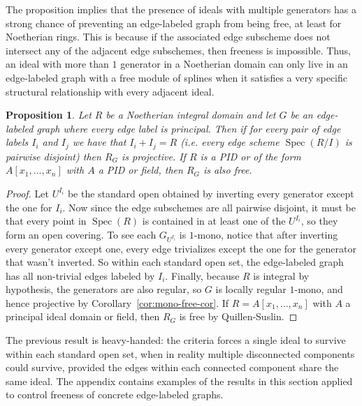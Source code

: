 \documentclass{article}
\DeclareMathOperator{\Spec}{Spec}
\newtheorem{proposition}{Proposition}
\begin{document}
The proposition implies that the presence of ideals with multiple generators has a strong chance of preventing an edge-labeled graph from being free, at least for Noetherian rings. This is because if the associated edge subscheme does not intersect any of the adjacent edge subschemes, then freeness is impossible. Thus, an ideal with more than $1$ generator in a Noetherian domain can only live in an edge-labeled graph with a free module of splines when it satisfies a very specific structural relationship with every adjacent ideal.



\begin{proposition}
\label{prop:noetherian-free}
Let $R$ be a Noetherian integral domain and let $G$ be an edge-labeled graph where every edge label is principal. Then if for every pair of edge labels $I_i$ and $I_j$ we have that $I_i + I_j = R$ (i.e. every edge scheme $\Spec(R/I)$ is pairwise disjoint) then $R_G$ is projective. If $R$ is a PID or of the form $A[x_1,\dots,x_n]$ with $A$ a PID or field, then $R_G$ is also free.
\end{proposition}
\begin{proof}
Let $U^{I_i}$ be the standard open obtained by inverting every generator except the one for $I_i$. Now since the edge subschemes are all pairwise disjoint, it must be that every point in $\Spec(R)$ is contained in at least one of the $U^{I_i}$, so they form an open covering. To see each $G_{U^{I_i}}$ is $1$-mono, notice that after inverting every generator except one, every edge trivializes except the one for the generator that wasn't inverted. So within each standard open set, the edge-labeled graph has all non-trivial edges labeled by $I_i$. Finally, because $R$ is integral by hypothesis, the generators are also regular, so $G$ is locally regular $1$-mono, and hence projective by Corollary~\ref{cor:mono-free-cor}. If $R=A[x_1,\dots,x_n]$ with $A$ a principal ideal domain or field, then $R_G$ is free by Quillen-Suslin.
\end{proof}

The previous result is heavy-handed: the criteria forces a single ideal to survive within each standard open set, when in reality multiple disconnected components could survive, provided the edges within each connected component share the same ideal. The appendix contains examples of the results in this section applied to control freeness of concrete edge-labeled graphs.
\end{document}
